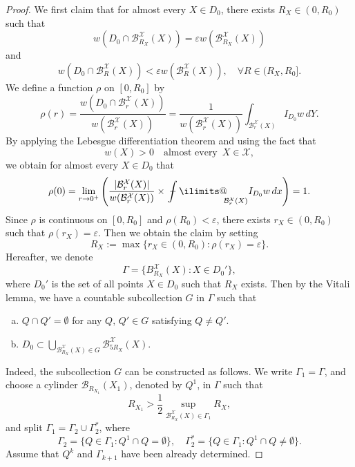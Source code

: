 \documentclass[reqno]{amsart}
\numberwithin{equation}{section}
\theoremstyle{plain}
\theoremstyle{definition}
\theoremstyle{remark}
\begin{document}
\begin{proof}
We first claim that for almost every $X\in D_0$, there exists  $R_X\in (0, R_0)$ such that 
\begin{equation*}
w(D_0\cap {\mathcal{B}}^{\mathcal{X}}_{R_X}(X))=\varepsilon w({\mathcal{B}}_{R_X}^{\mathcal{X}}(X))
\end{equation*}
and 
\begin{equation}		\label{160804@eq9b}
w(D_0\cap {\mathcal{B}}^{\mathcal{X}}_{R}(X))< \varepsilon w({\mathcal{B}}_R^{\mathcal{X}}(X)), \quad \forall R\in (R_X, R_0].
\end{equation}
We define a function $\rho$ on $[0,R_0]$  by 
\[
\rho(r)=\frac{w(D_0\cap {\mathcal{B}}^{\mathcal{X}}_r(X))}{w({\mathcal{B}}^{\mathcal{X}}_r(X))}=\frac{1}{w({\mathcal{B}}_r^{\mathcal{X}}(X))}\int_{{\mathcal{B}}_r^{\mathcal{X}}(X)}I_{D_0}w\,dY.
\]
By applying the Lebesgue differentiation theorem and using the fact that 
$$
w(X)>0 \quad \text{almost every }\, X\in {\mathcal{X}}, 
$$
we obtain for almost every $X\in D_0$ that 
$$
\rho(0)=\lim_{r\to 0^+}\left(\frac{|{\mathcal{B}}_r^{\mathcal{X}}(X)|}{w({\mathcal{B}}_r^{\mathcal{X}}(X))}\times {\operatorname{\,\,\text{\bf--}\kern-.98em\DOTSI\intop\ilimits@\!\!}}_{{\mathcal{B}}_r^{\mathcal{X}}(X)}I_{D_0}w\,dx\right)=1.
$$
Since $\rho$ is continuous on $[0, R_0]$ and $\rho(R_0)<\varepsilon$, there exists $r_X\in (0,R_0)$ such that $\rho(r_X)=\varepsilon$.
Then we obtain the claim by setting
$$
R_X:=\max\{r_X\in (0,R_0):\rho(r_X)=\varepsilon\}.
$$
Hereafter, we denote 
$$
\Gamma=\big\{B^{\mathcal{X}}_{R_X}(X):X\in D_0'\big\},
$$
where  $D_0'$ is  the set of all points $X\in D_0$ such that $R_X$ exists.
Then by the Vitali lemma, we have a countable subcollection $G$ in $\Gamma$ such that  
\begin{enumerate}[(a)]
\item
$Q\cap Q'=\emptyset$ for any $Q,\, Q'\in G$ satisfying $Q\neq Q'$.
\item
$D_0\subset \bigcup_{{\mathcal{B}}_{R_X}^{\mathcal{X}}(X)\in G}{\mathcal{B}}_{5R_X}^{\mathcal{X}}(X)$.
\end{enumerate}
Indeed, the subcollection $G$ can be constructed as follows.
We write $\Gamma_1=\Gamma$, and  choose a cylinder ${\mathcal{B}}_{R_{X_1}}(X_1)$, denoted by $Q^1$, in  $\Gamma$ such that 
$$
R_{X_1}>\frac{1}{2}\sup_{{\mathcal{B}}^{\mathcal{X}}_{R_X}(X)\in \Gamma_1}R_X,
$$
and split $\Gamma_1=\Gamma_2\cup \Gamma_2^*$, where 
$$
\Gamma_2=\{Q\in \Gamma_1: Q^1\cap Q=\emptyset\}, \quad \Gamma_2^*=\{Q\in \Gamma_1:Q^1\cap Q\neq \emptyset\}.
$$
Assume that $Q^k$ and  $\Gamma_{k+1}$ have been already determined.

\end{proof}
\end{document}

